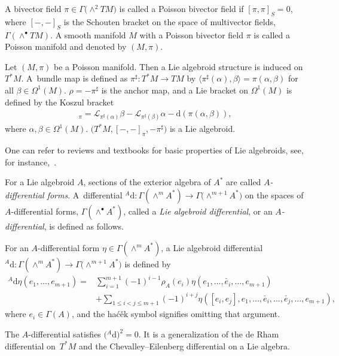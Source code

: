 \documentclass[10pt,a4paper]{amsart}
\numberwithin{equation}{section}
\newcommand{\calL}{{\mathcal L}}
\newcommand{\rhoa}{{\rho_A}}
\newcommand{\rd}{\mathrm{d}}
\begin{document}
\begin{Example}\label{Poisson}
%
A bivector field $\pi \in \Gamma\bigl(\wedge^2 TM\bigr)$ is called a Poisson bivector field if $[\pi, \pi]_S =0$, where $[-,-]_S$ is the Schouten bracket on the space of multivector fields, $\Gamma(\wedge^{\bullet} TM)$.
A smooth manifold $M$ with a Poisson bivector field $\pi$ is called a Poisson manifold and denoted by $(M, \pi)$.


%
Let $(M, \pi)$ be a Poisson manifold. Then a Lie algebroid structure is induced on $T^*M$.
A~bundle map is defined as
$\pi^{\sharp}\colon T^*M \rightarrow TM$ by $\bigl\langle\pi^{\sharp}(\alpha),\beta\bigr\rangle
= \pi(\alpha, \beta)$ for all $\beta \in \Omega^1(M)$.
$\rho= - \pi^{\sharp}$ is the anchor map, and
a Lie bracket on $\Omega^1(M)$ is defined by the Koszul bracket
\begin{gather*}
[\alpha, \beta]_{\pi} = \calL_{\pi^{\sharp} (\alpha)}\beta - \calL_{\pi^{\sharp} (\beta)} \alpha - \rd(\pi(\alpha, \beta)),
\end{gather*}
where $\alpha, \beta \in \Omega^1(M)$.
$\bigl(T^*M, [-, -]_{\pi}, -\pi^{\sharp}\bigr)$ is a Lie algebroid.
\end{Example}

One can refer to reviews and textbooks for basic properties of Lie algebroids, see, for instance,~\cite{Mackenzie}.

For a Lie algebroid $A$, sections of the exterior algebra of $A^*$ are called \textit{$A$-differential forms}.
A~differential ${}^A \rd\colon \Gamma(\wedge^m A^*)
\rightarrow \Gamma\bigl(\wedge^{m+1} A^*\bigr)$ on the spaces of $A$-differential forms, $\Gamma(\wedge^{\bullet} A^*)$,
called a \textit{Lie algebroid differential}, or an \textit{$A$-differential},
is defined as follows.
\begin{Definition}
For an $A$-differential form $\eta \in \Gamma(\wedge^m A^*)$,
a Lie algebroid differential ${}^A \rd\colon \allowbreak\Gamma(\wedge^m A^*)
\rightarrow \Gamma\bigl(\wedge^{m+1} A^*\bigr)$ is defined by
\begin{align*}%
{}^A \rd \eta(e_1, \ldots, e_{m+1})
={}& \sum_{i=1}^{m+1} (-1)^{i-1} \rhoa(e_i) \eta(e_1, \ldots,
\check{e_i}, \ldots, e_{m+1})
 \\ &
+ \sum_{1 \leq i < j \leq m+1} (-1)^{i+j} \eta([e_i, e_j], e_1, \ldots, \check{e_i}, \ldots, \check{e_j}, \ldots, e_{m+1}),
\end{align*}
where $e_i \in \Gamma(A)$, and the ha\'{c}\v{e}k symbol signifies omitting that argument.
\end{Definition}
The $A$-differential satisfies $\bigl({}^A \rd\bigr)^2=0$.
It is a generalization of the de Rham differential on~$T^*M$ and the Chevalley--Eilenberg differential on a Lie algebra.
\end{document}
